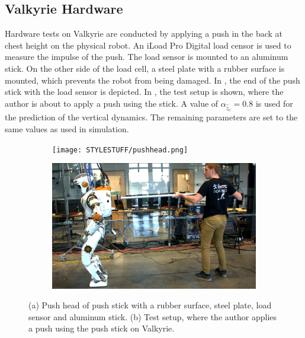 \subsection{Valkyrie Hardware} 
Hardware tests on Valkyrie are conducted by applying a push in the back at chest height on the physical robot. An iLoad Pro Digital load censor \cite{iload} is used to measure the impulse of the push. The load sensor is mounted to an aluminum stick. On the other side of the load cell, a steel plate with a rubber surface is mounted, which prevents the robot from being damaged. In , the end of the push stick with the load sensor is depicted. In , the test setup is shown, where the author is about to apply a push using the stick. A value of $\alpha_{\hat{\ddot{z}}_{c}}=0.8$ is used for the prediction of the vertical dynamics. The remaining parameters are set to the same values as used in simulation.
\begin{figure}
\centering
  \begin{subfigure}{0.495\textwidth}
  \centering
  \texttt{[image: STYLESTUFF/pushhead.png]}
   \caption{}
    \label{fig:pushhead}
  \end{subfigure}
  \begin{subfigure}{0.495\textwidth}
    \centering
  \includegraphics[width=.94\linewidth]{STYLESTUFF/authorpush.png}
  \caption{}
   \label{fig:authorpush}
  \end{subfigure}
  \caption{(a) Push head of push stick with a rubber surface, steel plate, load sensor and aluminum stick. (b) Test setup, where the author applies a push using the push stick on Valkyrie.}
  \label{fig:pushsetup}
\end{figure}

